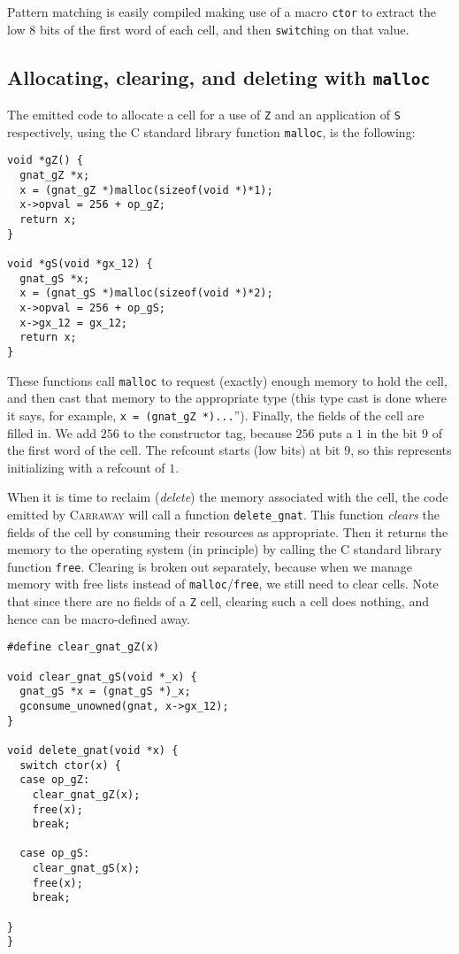 \documentclass{book}[12pt]
\newcommand{\carraway}[0]{\textsc{Carraway}\xspace}
\begin{document}
Pattern matching is easily compiled making use of a macro
\texttt{ctor} to extract the low 8 bits of the first word of each
cell, and then \texttt{switch}ing on that value.

\subsection{Allocating, clearing, and deleting with \texttt{malloc}}

The emitted code to allocate a cell for a use of \texttt{Z} and an
application of \texttt{S} respectively, using the C standard library
function \texttt{malloc}, is the following:

\begin{verbatim}
void *gZ() {
  gnat_gZ *x;
  x = (gnat_gZ *)malloc(sizeof(void *)*1);
  x->opval = 256 + op_gZ;
  return x;
}

void *gS(void *gx_12) {
  gnat_gS *x;
  x = (gnat_gS *)malloc(sizeof(void *)*2);
  x->opval = 256 + op_gS;
  x->gx_12 = gx_12;
  return x;
}
\end{verbatim}

\noindent These functions call \texttt{malloc} to request (exactly)
enough memory to hold the cell, and then cast that memory to the
appropriate type (this type cast is done where it says, for example,
\texttt{x = (gnat\_gZ *)...}'').  Finally, the fields of the cell are
filled in.  We add $256$ to the constructor tag, because $256$ puts a
$1$ in the bit $9$ of the first word of the cell.  The refcount starts
(low bits) at bit $9$, so this represents initializing with a refcount
of $1$.

When it is time to reclaim (\emph{delete}) the memory associated with
the cell, the code emitted by \carraway will call a function
\texttt{delete\_gnat}.  This function \emph{clears} the fields of the
cell by consuming their resources as appropriate.  Then it returns the
memory to the operating system (in principle) by calling the C
standard library function \texttt{free}.  Clearing is broken out
separately, because when we manage memory with free lists instead of
\texttt{malloc}/\texttt{free}, we still need to clear cells.  Note
that since there are no fields of a \texttt{Z} cell, clearing such a
cell does nothing, and hence can be macro-defined away.  

\begin{verbatim}
#define clear_gnat_gZ(x) 

void clear_gnat_gS(void *_x) {
  gnat_gS *x = (gnat_gS *)_x;
  gconsume_unowned(gnat, x->gx_12);
}

void delete_gnat(void *x) {
  switch ctor(x) {
  case op_gZ: 
    clear_gnat_gZ(x);
    free(x);
    break;

  case op_gS: 
    clear_gnat_gS(x);
    free(x);
    break;

}
}
\end{verbatim}
\end{document}
